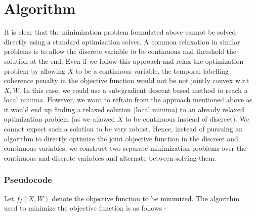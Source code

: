 
\section{Algorithm}

It is clear that the minimization problem formulated above cannot
be solved directly using a standard optimization solver. A common
relaxation in similar problems is to allow the discrete variable to
be continuous and threshold the solution at the end. Even if we follow
this approach and relax the optimization problem by allowing $X$
to be a continuous variable, the temporal labelling coherence penalty
in the objective function would not be not jointly convex w.r.t $X,W$.
In this case, we could use a sub-gradient descent based method to
reach a local minima. However, we want to refrain from the approach
mentioned above as it would end up finding a relaxed solution (local
minima) to an already relaxed optimization problem (as we allowed
$X$ to be continuous instead of discreet). We cannot expect such
a solution to be very robust. Hence, instead of pursuing an algorithm
to directly optimize the joint objective function in the discreet
and continuous variables, we construct two separate minimization problems
over the continuous and discrete variables and alternate between solving
them.


\subsubsection*{Pseudocode}

Let $f_{I}(X,W)$ denote the objective function to be minimized. The
algorithm used to minimize the objective function is as follows -

